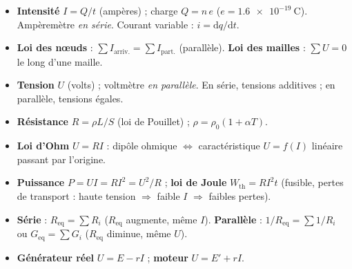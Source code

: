 \documentclass[11pt,a4paper]{article}
\newcommand{\dd}{\mathrm{d}}
\newcommand{\Req}{R_{\mathrm{eq}}}
\newcommand{\Geq}{G_{\mathrm{eq}}}
\begin{document}
\begin{tcolorbox}[boxbase,colback=primarydark!6,colframe=primarydark,
   title={\textsc{L'essentiel de la Fiche 10}}]
\begin{itemize}[leftmargin=1.5em,topsep=2pt,itemsep=2pt]
  \item \textbf{Intensité} $I=Q/t$ (ampères) ; charge $Q=n\,e$ ($e=\SI{1,6e-19}{\coulomb}$).
        Ampèremètre \emph{en série}. Courant variable : $i=\dd q/\dd t$.
  \item \textbf{Loi des nœuds} : $\sum I_{\text{arriv.}}=\sum I_{\text{part.}}$ (parallèle).
        \textbf{Loi des mailles} : $\sum U=0$ le long d'une maille.
  \item \textbf{Tension} $U$ (volts) ; voltmètre \emph{en parallèle}. En série, tensions additives ;
        en parallèle, tensions égales.
  \item \textbf{Résistance} $R=\rho L/S$ (loi de Pouillet) ; $\rho=\rho_0(1+\alpha T)$.
  \item \textbf{Loi d'Ohm} $U=RI$ : dipôle ohmique $\Leftrightarrow$ caractéristique $U=f(I)$
        linéaire passant par l'origine.
  \item \textbf{Puissance} $P=UI=RI^2=U^2/R$ ; \textbf{loi de Joule} $W_{\mathrm{th}}=RI^2t$
        (fusible, pertes de transport : haute tension $\Rightarrow$ faible $I$ $\Rightarrow$ faibles pertes).
  \item \textbf{Série} : $\Req=\sum R_i$ ($\Req$ augmente, même $I$). \textbf{Parallèle} :
        $1/\Req=\sum 1/R_i$ ou $\Geq=\sum G_i$ ($\Req$ diminue, même $U$).
  \item \textbf{Générateur réel} $U=E-rI$ ; \textbf{moteur} $U=E'+rI$.
\end{itemize}
\end{tcolorbox}
\end{document}
